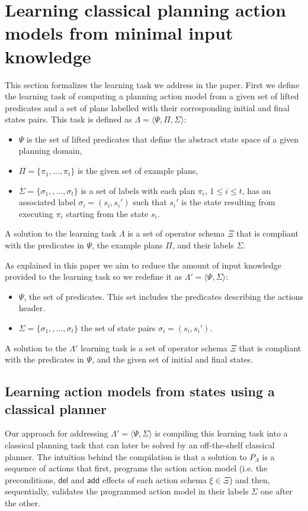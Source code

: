 \documentclass[letterpaper]{article} %
\newcommand{\tup}[1]{{\langle #1 \rangle}}
\newcommand{\del}{\mathsf{del}}     %
\newcommand{\add}{\mathsf{add}}     %
\begin{document}
\section{Learning classical planning action models from minimal input knowledge}
This section formalizes the learning task we address in the paper. First we define the learning task of computing a planning action model from a given set of lifted predicates and a set of plans labelled with their corresponding initial and final states pairs. This task is defined as $\Lambda=\tup{\Psi,\Pi,\Sigma}$: 
\begin{itemize}
\item $\Psi$ is the set of lifted predicates that define the abstract state space of a given planning domain,
\item $\Pi=\{\pi_1,\ldots,\pi_t\}$ is the given set of example plans,
\item $\Sigma=\{\sigma_1,,\ldots,\sigma_t\}$ is a set of labels with each plan $\pi_i$, {\small $1\leq i\leq t$}, has an associated label $\sigma_i=(s_i,s_i')$ such that $s_i'$ is the state resulting from executing $\pi_i$ starting from the state $s_i$. 
\end{itemize}

A solution to the learning task $\Lambda$ is a set of operator schema $\Xi$ that is compliant with the predicates in $\Psi$, the example plans $\Pi$, and their labels $\Sigma$.

As explained in this paper we aim to reduce the amount of input knowledge provided to the learning task so we redefine it as $\Lambda'=\tup{\Psi,\Sigma}$: 
\begin{itemize}
\item $\Psi$, the set of predicates. This set includes the predicates describing the actions header.
\item $\Sigma=\{\sigma_1,,\ldots,\sigma_t\}$ the set of state pairs $\sigma_i=(s_i,s_i')$. 
\end{itemize}
A solution to the $\Lambda'$ learning task is a set of operator schema $\Xi$ that is compliant with the predicates in $\Psi$, and the given set of initial and final states.


\subsection{Learning action models from states using a classical planner}
Our approach for addressing $\Lambda'=\tup{\Psi,\Sigma}$ is compiling this learning task into a classical planning task that can later be solved by an off-the-shelf classical planner. The intuition behind the compilation is that a solution to $P_{\Lambda}$ is a sequence of actions that first, programs the action action model (i.e. the preconditions, $\del$ and $\add$ effects of each action schema $\xi\in\Xi$) and then, sequentially, validates the programmed action model in their labels $\Sigma$ one after the other.
\end{document}
